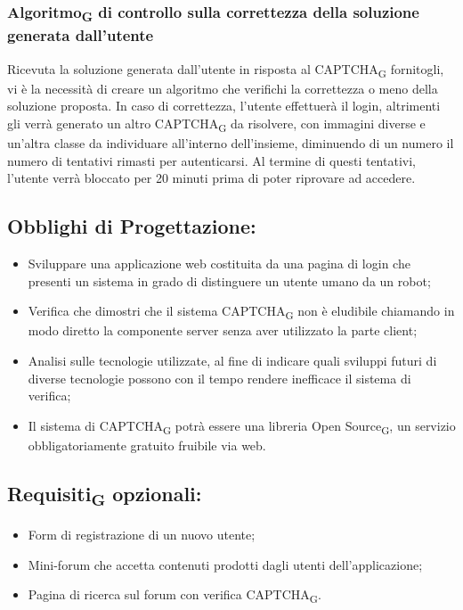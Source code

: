 \subsubsection{Algoritmo\textsubscript{G} di controllo sulla correttezza della soluzione generata dall'utente}
Ricevuta la soluzione generata dall'utente in risposta al CAPTCHA\textsubscript{G} fornitogli, vi è la necessità di creare un algoritmo che verifichi la correttezza o meno della soluzione proposta. In caso di correttezza, l'utente effettuerà il login, altrimenti gli verrà generato un altro CAPTCHA\textsubscript{G} da risolvere, con immagini diverse e un'altra classe da individuare all'interno dell'insieme, diminuendo di un numero il numero di tentativi rimasti per autenticarsi. Al termine di questi tentativi, l'utente verrà bloccato per 20 minuti prima di poter riprovare ad accedere. 

\subsection{Obblighi di Progettazione:}
\begin{itemize}
    \item Sviluppare una applicazione web costituita da una pagina di login che presenti un sistema in grado di distinguere un utente umano da un robot;
    \item Verifica che dimostri che il sistema CAPTCHA\textsubscript{G} non è eludibile chiamando in modo diretto la componente server senza aver utilizzato la parte client;
    \item Analisi sulle tecnologie utilizzate, al fine di indicare quali sviluppi futuri di diverse tecnologie possono con il tempo rendere inefficace il sistema di verifica;
    \item Il sistema di CAPTCHA\textsubscript{G} potrà essere una libreria Open Source\textsubscript{G}, un servizio obbligatoriamente gratuito fruibile via web.
\end{itemize}

\subsection{Requisiti\textsubscript{G} opzionali:}
\begin{itemize}
    \item Form di registrazione di un nuovo utente;
    \item Mini-forum che accetta contenuti prodotti dagli utenti dell'applicazione;
    \item Pagina di ricerca sul forum con verifica CAPTCHA\textsubscript{G}.
\end{itemize}

